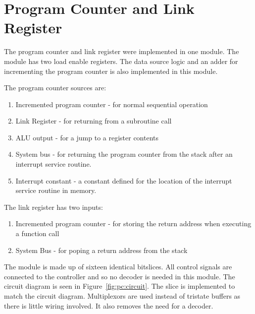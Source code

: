 
\section{Program Counter and Link Register}


The program counter and link register were implemented in one module.
The module has two load enable registers. 
The data source logic and an adder for incrementing the program counter is also implemented in this module.

The program counter sources are:
\begin{enumerate}
\item Incremented program counter - for normal sequential operation
\item Link Register - for returning from a subroutine call
\item ALU output - for a jump to a register contents
\item System bus - for returning the program counter from the stack after an interrupt service routine.
\item Interrupt constant - a constant defined for the location of the interrupt service routine in memory.
\end{enumerate}

The link register has two inputs:
\begin{enumerate}
\item Incremented program counter - for storing the return address when executing a function call
\item System Bus - for poping a return address from the stack 
\end{enumerate}

The module is made up of sixteen identical bitslices. 
All control signals are connected to the controller and so no decoder is needed in this module.
The circuit diagram is seen in Figure~\ref{fig:pc:circuit}.
The slice is implemented to match the circuit diagram. 
Multiplexors are used instead of tristate buffers as there is little wiring involved. 
It also removes the need for a decoder.


